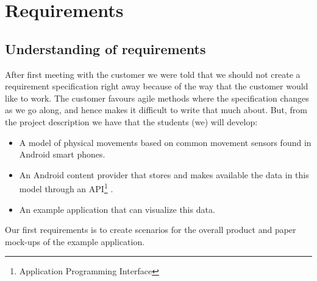 \chapter{Requirements}
\section{Understanding of requirements}

After first meeting with the customer we were told that we should not create a requirement specification right away because of the way that the customer would like to work. The customer favours agile methods where the specification changes as we go along, and hence makes it difficult to write that much about. But, from the project description we have that the students (we) will develop:
\begin{itemize}
\item A model of physical movements based on common movement sensors found in Android smart phones.
\item An Android content provider that stores and makes available the data in this model through an API\footnote{Application Programming Interface} .
\item An example application that can visualize this data.
\end{itemize}

Our first requirements is to create scenarios for the overall product and paper mock-ups of the example application.